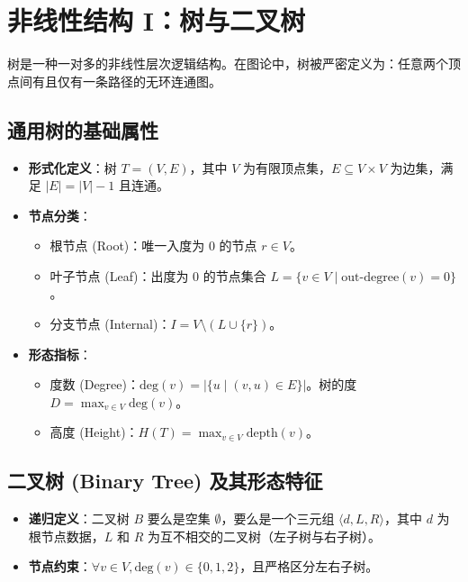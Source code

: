 \clearpage
\begingroup
\let\clearpage\relax
\let\cleardoublepage\relax
\vspace*{\fill}
\chapter{非线性结构 I：树与二叉树}
\begin{center}
树是一种一对多的非线性层次逻辑结构。在图论中，树被严密定义为：任意两个顶点间有且仅有一条路径的无环连通图。
\end{center}
\vspace*{\fill}
\endgroup
\clearpage


\section{通用树的基础属性}

\begin{itemize}
    \item \textbf{形式化定义}：树 $T = (V, E)$，其中 $V$ 为有限顶点集，$E \subseteq V \times V$ 为边集，满足 $|E| = |V| - 1$ 且连通。
    \item \textbf{节点分类}：
    \begin{itemize}
        \item 根节点 (Root)：唯一入度为 0 的节点 $r \in V$。
        \item 叶子节点 (Leaf)：出度为 0 的节点集合 $L = \{ v \in V \mid \text{out-degree}(v) = 0 \}$。
        \item 分支节点 (Internal)：$I = V \setminus (L \cup \{r\})$。
    \end{itemize}
    \item \textbf{形态指标}：
    \begin{itemize}
        \item 度数 (Degree)：$\text{deg}(v) = |\{ u \mid (v, u) \in E \}|$。树的度 $D = \max_{v \in V} \text{deg}(v)$。
        \item 高度 (Height)：$H(T) = \max_{v \in V} \text{depth}(v)$。
    \end{itemize}
\end{itemize}

\section{二叉树 (Binary Tree) 及其形态特征}

\begin{itemize}
    \item \textbf{递归定义}：二叉树 $B$ 要么是空集 $\emptyset$，要么是一个三元组 $\langle d, L, R \rangle$，其中 $d$ 为根节点数据，$L$ 和 $R$ 为互不相交的二叉树（左子树与右子树）。
    \item \textbf{节点约束}：$\forall v \in V, \text{deg}(v) \in \{0, 1, 2\}$，且严格区分左右子树。
\end{itemize}

